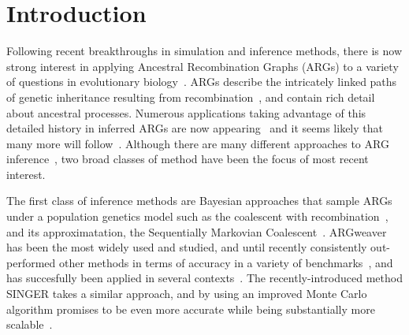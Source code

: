 \documentclass{article}
\begin{document}
\section*{Introduction}
Following recent breakthroughs in simulation and inference methods,
there is now strong interest in applying Ancestral Recombination Graphs (ARGs)
to a variety of questions in evolutionary
biology~\citep{lewanski_era_2024,brandt_promise_2024,nielsen_inference_2025}.
ARGs describe the intricately linked paths
of genetic inheritance resulting from
recombination~\citep{hudson_properties_1983,griffiths_ancestral_1996,wong_general_2023},
and contain rich detail about ancestral processes.
Numerous applications taking advantage of this detailed history
in inferred ARGs are now appearing~\citep{
stern_approximate_2019,
osmond_estimating_2021,
fan_genealogical_2022,
hejase_deep_2022,
guo_recombination-aware_2022,
ignatieva_ongoing_2022,
wang_complex_2022,
zhang_biobank-scale_2023,
nowbandegani_extremely_2023,
ignatieva_distribution_2023,
fan_likelihood_2023,
huang_estimating_2024,
grundler_geographic_2024,
korfmann_simultaneous_2024,
deraje_inferring_2024,
speidel2025high}
and it seems likely that many more will
follow~\citep{harris_database_2019,harris_using_2023}.
Although there are many different approaches to ARG
inference~\citep{wong_general_2023}, two broad classes of method
have been the focus of most recent interest.

The first class of inference methods are Bayesian approaches
that sample ARGs under a population genetics model such as the
coalescent with recombination~\citep{hudson_properties_1983},
and its approximatation, the Sequentially Markovian
Coalescent~\citep{mcvean_approximating_2005,marjoram_fast_2006}.
ARGweaver~\citep{rasmussen_genome-wide_2014} has been the most widely used and studied,
and until recently consistently out-performed other methods in terms 
of accuracy in a variety of benchmarks~\citep{brandt2022evaluation},
and has succesfully been applied in several
contexts~\citep[e.g.,][]{de_chimpanzee_2016,shriner_whole_2018,hejase_genomic_2020,
stankowski_genetic_2024}. 
The recently-introduced method SINGER takes a similar approach,
and by using an improved Monte Carlo algorithm
promises to be even more accurate while being substantially more
scalable~\citep{deng_robust_2024}. 
\end{document}
